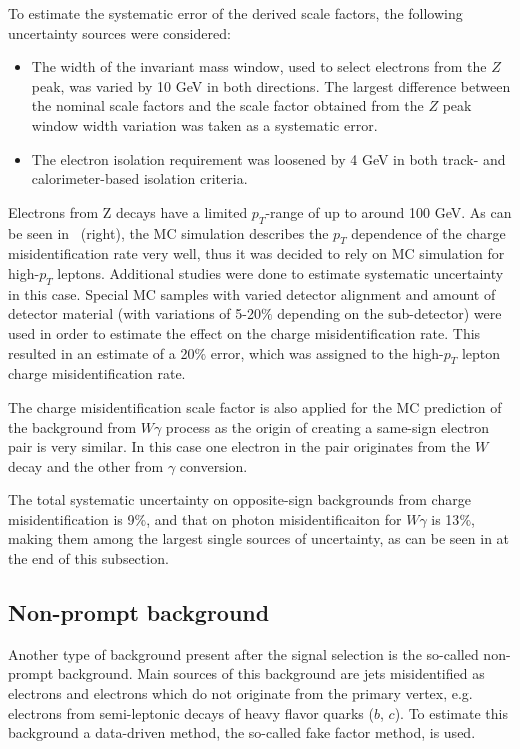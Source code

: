 To estimate the systematic error of the derived scale factors, the following uncertainty sources were considered:
\begin{itemize}
 \item The width of the invariant mass window, used to select electrons from the $Z$ peak, was varied by 10 GeV in both directions.
 The largest difference between the nominal scale factors and the scale factor obtained from the $Z$ peak window width variation was taken as a systematic error.
 \item The electron isolation requirement was loosened by 4 GeV in both track- and calorimeter-based isolation criteria.
\end{itemize}
Electrons from Z decays have a limited $p_T$-range of up to around 100 GeV. As can be seen in~ (right), 
the MC simulation describes the $p_T$ dependence of the charge misidentification rate very well, thus it was decided to rely on MC simulation 
for high-$p_T$ leptons. Additional studies were done to estimate systematic uncertainty in this case.
Special MC samples with varied detector alignment and amount of detector material (with variations of 5-20$\%$ depending on the sub-detector) 
were used in order to estimate the effect on the charge misidentification rate.
This resulted in an estimate of a 20$\%$ error, which was assigned to the high-$p_T$ lepton charge misidentification rate.

The charge misidentification scale factor is also applied for the MC prediction of the background from $W\gamma$ process
as the origin of creating a same-sign electron pair is very similar.
In this case one electron in the pair originates from the $W$ decay and the other from $\gamma$ conversion.

The total systematic uncertainty on opposite-sign backgrounds from charge misidentification is 9$\%$, and that on photon misidentificaiton for $W\gamma$ is 13$\%$, making them among the largest single sources of uncertainty, as can be seen in  at the end of this subsection.

\subsection{Non-prompt background}
\label{subsec:fakes_description}

Another type of background present after the signal selection is the so-called non-prompt background.
Main sources of this background are jets misidentified as electrons and electrons which do not originate from 
the primary vertex, e.g. electrons from semi-leptonic decays of heavy flavor quarks ($b$, $c$).
To estimate this background a data-driven method, the so-called fake factor method, is used.

